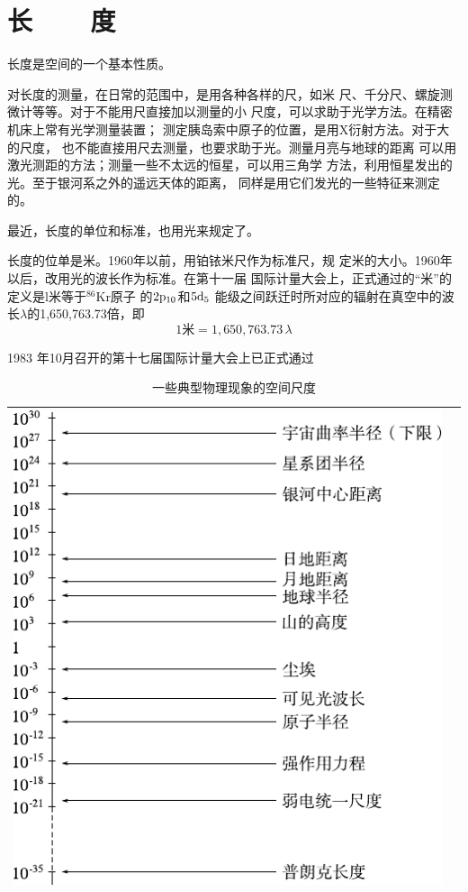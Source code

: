 \section[长度]{长~~~~度}\label{sec:01.03}

长度是空间的一个基本性质。

对长度的测量，在日常的范围中，是用各种各样的尺，如米
尺、千分尺、螺旋测微计等等。对于不能用尺直接加以测量的小
尺度，可以求助于光学方法。在精密机床上常有光学测量装置；
测定胰岛索中原子的位置，是用X衍射方法。对于大的尺度，
也不能直接用尺去测量，也要求助于光。测量月亮与地球的距离
可以用激光测距的方法；测量一些不太远的恒星，可以用三角学
方法，利用恒星发出的光。至于银河系之外的遥远天体的距离，
同样是用它们发光的一些特征来测定的。

最近，长度的单位和标准，也用光来规定了。

长度的位单是米。1960年以前，用铂铱米尺作为标准尺，规
定米的大小。1960年以后，改用光的波长作为标准。在第十一届
国际计量大会上，正式通过的“米”的定义是l米等于$^{86}$Kr原子
\clearpage\noindent
的$2\rm{p}_{10}$和$5\rm{d}_5$
能级之间跃迁时所对应的辐射在真空中的波长$\lambda$的1,650,763.73倍，即
\begin{equation*}
  1 \text{米} = 1,650,763.73 \, \lambda
\end{equation*}


1983 年10月召开的第十七届国际计量大会上已正式通过
\\
\begin{table}[!h]
  \centering
  \caption{一些典型物理现象的空间尺度}
  \label{tab:01.03}
  \begin{tabular*}{\linewidth}{>{\centering}m{\linewidth}c}
    \toprule
    \includegraphics[width=0.8\linewidth]{figure/tab01.03} & \\
    \bottomrule
  \end{tabular*}
\end{table}
\clearpage


